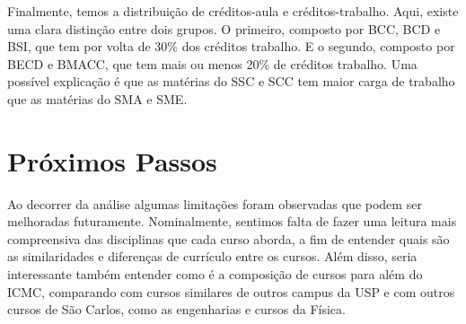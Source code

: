 \documentclass[12pt]{article}
\begin{document}
Finalmente, temos a distribuição de créditos-aula e créditos-trabalho. Aqui,
existe uma clara distinção entre dois grupos. O primeiro, composto por BCC, BCD
e BSI, que tem por volta de 30\% dos créditos trabalho. E o segundo, composto
por BECD e BMACC, que tem mais ou menos 20\% de créditos trabalho. Uma possível
explicação é que as matérias do SSC e SCC tem maior carga de trabalho que as
matérias do SMA e SME.

\section{Próximos Passos}

Ao decorrer da análise algumas limitações foram observadas que podem ser
melhoradas futuramente. Nominalmente, sentimos falta de fazer uma leitura mais
compreensiva das disciplinas que cada curso aborda, a fim de entender quais são
as similaridades e diferenças de currículo entre os cursos. Além disso, seria
interessante também entender como é a composição de cursos para além do ICMC,
comparando com cursos similares de outros campus da USP e com outros cursos de
São Carlos, como as engenharias e cursos da Física.
\end{document}
